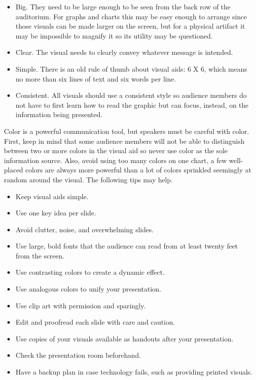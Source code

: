 \begin{itemize}
	\item Big. They need to be large enough to be seen from the back row of the auditorium. For graphs and charts this may be easy enough to arrange since those visuals can be made larger on the screen, but for a physical artifact it may be impossible to magnify it so its utility may be questioned.
	\item Clear. The visual needs to clearly convey whatever message is intended.
	\item Simple. There is an old rule of thumb about visual aids: 6 X 6, which means no more than six lines of text and six words per line.
	\item Consistent. All visuals should use a consistent style so audience members do not have to first learn how to read the graphic but can focus, instead, on the information being presented.
\end{itemize}

Color is a powerful communication tool, but speakers must be careful with color. First, keep in mind that some audience members will not be able to distinguish between two or more colors in the visual aid so never use color as the sole information source. Also, avoid using too many colors on one chart, a few well-placed colors are always more powerful than a lot of colors sprinkled seemingly at random around the visual. The following tips may help.

\begin{itemize}
	\item Keep visual aids simple.
	\item Use one key idea per slide.
	\item Avoid clutter, noise, and overwhelming slides.
	\item Use large, bold fonts that the audience can read from at least twenty 	feet from the screen.
	\item Use contrasting colors to create a dynamic effect.
	\item Use analogous colors to unify your presentation.
	\item Use clip art with permission and sparingly.
	\item Edit and proofread each slide with care and caution.
	\item Use copies of your visuals available as handouts after your presentation.
	\item Check the presentation room beforehand.
	\item Have a backup plan in case technology fails, such as providing printed visuals.
\end{itemize}

